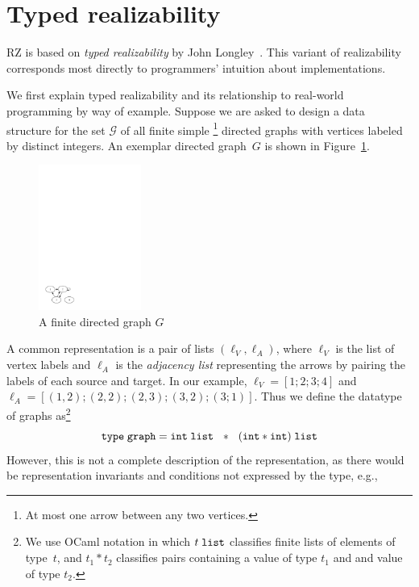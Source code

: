 \section{Typed realizability}
\label{sec:typed-realizability}

RZ is based on \emph{typed realizability} by John
Longley~\cite{Longley99}.   This variant of realizability corresponds most
directly to programmers' intuition about implementations.

We first explain typed realizability and its relationship to
real-world programming by way of example. Suppose we are asked to
design a data structure for the set $\mathcal{G}$ of all finite
simple%
\iflong
\footnote{At most one arrow between any two vertices.}
\fi %
directed graphs with vertices labeled by distinct integers. 
%
\iflong
An exemplar
directed graph~$G$ is shown in Figure~\ref{fig:digraph}.
%
\begin{figure}
  \centering
  \includegraphics[width=0.3\textwidth]{digraph}
  \caption{A finite directed graph $G$}
  \label{fig:digraph}
\end{figure}
\fi %
%
A common representation is a pair of lists $(\ell_V, \ell_A)$, where
$\ell_V$ is the list of vertex labels and $\ell_A$ is the \emph{adjacency list} 
representing the arrows by pairing the labels of each source and target.
\iflong
In our example,
$\ell_V = [1; 2;
3; 4]$ and $\ell_A = [(1,2); (2,2); (2,3); (3,2); (3;1)]$.
\fi %
%
Thus we define the datatype of graphs as\footnote{We use OCaml
  notation in which $t\;\mathtt{list}$ classifies finite lists of elements of
  type~$t$, and $t_1 * t_2$ classifies pairs containing a value of
  type $t_1$ and and value of type $t_2$.}
%
\begin{equation*}
  \mathtt{type}\; \mathtt{graph} = \mathtt{int}\;\mathtt{list} \ \ * \ \ (\mathtt{int} * \mathtt{int})\;\mathtt{list}
\end{equation*}
%
However, this is not a complete description of the representation, as
there would be representation invariants and conditions not expressed by the type, e.g.,
